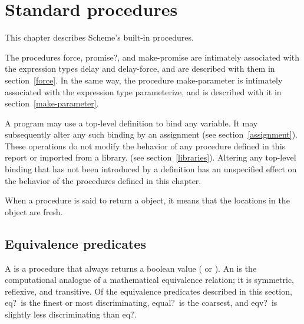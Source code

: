 
\chapter{Standard procedures}
\label{initialenv}
\label{builtinchapter}


This chapter describes Scheme's built-in procedures.  

The procedures {\cf force}, {\cf promise?}, and {\cf make-promise} are intimately associated
with the expression types {\cf delay} and {\cf delay-force}, and are described
with them in section~\ref{force}.  In the same way, the procedure
{\cf make-parameter} is intimately associated with the expression type
{\cf parameterize}, and is described with it in section~\ref{make-parameter}.

A program may use a top-level definition to bind any variable.  It may
subsequently alter any such binding by an assignment (see
section~\ref{assignment}).  These operations do not modify the behavior of
any procedure defined in this report or imported from a library.
(see section~\ref{libraries}).  Altering any top-level binding that has
not been introduced by a definition has an unspecified effect on the
behavior of the procedures defined in this chapter.

When a procedure is said to return a  object,
it means that the locations in the object are fresh.

\section{Equivalence predicates}
\label{equivalencesection}

A  is a procedure that always returns a boolean
value (\schtrue{} or \schfalse).  An  is
the computational analogue of a mathematical equivalence relation; it is
symmetric, reflexive, and transitive.  Of the equivalence predicates
described in this section, {\cf eq?}\ is the finest or most
discriminating, {\cf equal?}\ is the coarsest, and {\cf eqv?}\ is
slightly less discriminating than {\cf eq?}.  



